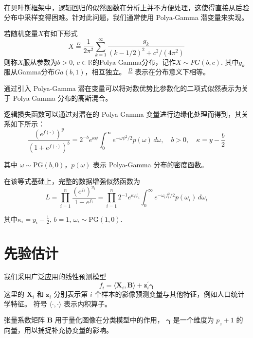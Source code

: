 \documentclass[AutoFakeBold]{LZUThesis}
\newcommand{\scite}[1]{\textsuperscript{\cite{#1}}}
\begin{document}
在贝叶斯框架中，逻辑回归的似然函数在分析上并不方便处理，这使得直接从后验分布中采样变得困难。针对此问题，我们通常使用 Polya-Gamma 潜变量来实现\scite{polson2013bayesian}。 

	若随机变量$X$有如下形式
	\begin{equation}
		X \overset{D}{=} \dfrac{1}{2\pi^{2}}\sum_{k=1}^{\infty}\dfrac{g_{k}}{(k-1/2)^{2} + c^{2}/(4\pi^{2})
		}
		\label{PG}
	\end{equation}
	则称$X$服从参数为$b>0$, $c\in\mathbb{R}$的Polya-Gamma分布，记作$X\sim PG(b,c)$. 其中$g_{k}$服从Gamma分布$Ga(b,1)$，相互独立。$\overset{D}{=}$表示在分布意义下相等。


通过引入 Polya-Gamma 潜在变量可以将对数优势比参数化的二项式似然表示为关于 Polya-Gamma 分布的高斯混合\scite{polson2013bayesian}。

逻辑损失函数可以通过对潜在的 Polya-Gamma 变量进行边缘化处理而得到，其关系如下所示：
\begin{equation}
	\frac{(e^{f(\cdot)})^y}{(1 + e^{f(\cdot)})^b} = 2^{-b} e^{\kappa \psi} \int_0^\infty e^{-\omega \psi^2 / 2} p(\omega) \, d\omega,
	\quad b > 0, \quad \kappa = y - \frac{b}{2}
\end{equation}

其中 \( \omega \sim \text{PG}(b, 0) \)，\( p(\omega) \) 表示 Polya-Gamma 分布的密度函数。

在该等式基础上，完整的数据增强似然函数为
\begin{equation}
	L = \prod_{i=1}^n \frac{(e^{f_i})^{y_i}}{1 + e^{f_i}} 
	= \prod_{i=1}^n 2^{-1} e^{\kappa_i \psi_i} \int_0^\infty e^{-\omega_i f_i^2 / 2} p(\omega_i) \, d\omega_i
\end{equation}

其中$\kappa_i = y_i - \frac{1}{2}$, $b = 1$, $\omega_i \sim \text{PG}(1, 0)$.

\section{先验估计}
我们采用广泛应用的线性预测模型
\begin{equation}
	f_{i} = \langle \mathbf{X}_{i}, \boldsymbol{B}\rangle + \mathbf{z}_{i}^{\prime}\boldsymbol{\gamma}
\end{equation}
这里的 \( \mathbf{X}_i \) 和 \( \mathbf{z}_i \) 分别表示第 \( i \) 个样本的影像预测变量与其他特征，例如人口统计学特征。  
符号 \( \langle \cdot, \cdot \rangle \) 表示内积算子。

张量系数矩阵 \( \boldsymbol{B} \) 用于量化图像在分类模型中的作用，  
\( \boldsymbol{\gamma} \) 是一个维度为 \( p_z + 1 \) 的向量，用以捕捉补充协变量的影响。
\end{document}
